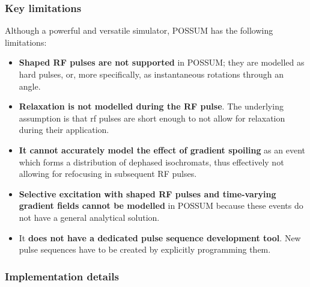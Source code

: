 \subsubsection{Key limitations}
Although a powerful and versatile simulator, POSSUM has the following limitations:
\begin{itemize}
    
    \item \textbf{Shaped RF pulses are not supported} in POSSUM; they are modelled as hard pulses, or, more specifically, as instantaneous rotations through an angle.
    
    \item \textbf{Relaxation is not modelled during the RF pulse}.
    The underlying assumption is that \ac{rf} pulses are short enough to not allow for relaxation during their application. 
    
    \item \textbf{It cannot accurately model the effect of gradient spoiling} as an event which forms a distribution of dephased isochromats, thus effectively not allowing for refocusing in subsequent RF pulses.
    
    \item \textbf{Selective excitation with shaped RF pulses and time-varying gradient fields cannot be modelled} in POSSUM because these events do not have a general analytical solution.
    
    \item It \textbf{does not have a dedicated pulse sequence development tool}. 
    New pulse sequences have to be created by explicitly programming them.
    
\end{itemize}

\hfill

\subsubsection{Implementation details}

